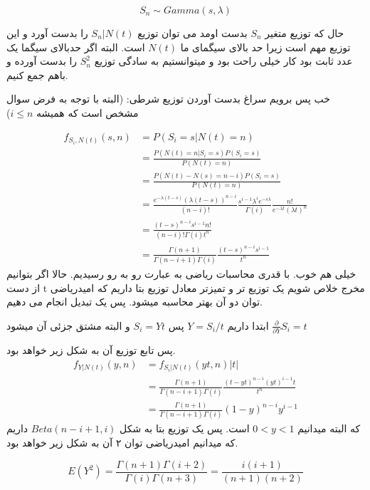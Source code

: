 \documentclass{article}[12pt]
\begin{document}
\begin{equation}
S_n \sim Gamma(s,\lambda)
\end{equation}

حال که توزیع متغیر 
$S_n$
بدست اومد می توان توزیع 
$S_n|N(t)$
را بدست آورد و این توزیع مهم است زیرا حد بالای سیگمای ما 
$N(t)$
است. البته اگر حدبالای سیگما یک عدد ثابت بود کار خیلی راحت بود و میتوانستیم به سادگی توزیع
$S_n^2$
را بدست آورده و باهم جمع کنیم. 

خب پس برویم سراغ بدست آوردن توزیع شرطی:
(البته با توجه به فرض سوال مشخص است که همیشه
$i\leq n$)

\begin{equation}
\begin{split}
f_{S_i,N(t)}(s,n) &= 
P(S_i = s | N(t)=n) \\&= 
\frac{P(N(t)=n|S_i = s)P(S_i=s)}{P(N(t)=n)}\\
&= 
\frac{P(N(t)-N(s) = n-i)P(S_i=s)}{P(N(t)=n)}
\\
&= 
\frac{e^{-\lambda (t-s)}(\lambda(t-s))^{n-i}}{(n-i)!}
\frac{s^{i-1} \lambda^i e^{-s\lambda}}{\Gamma(i)}
\frac{n!}{e^{-\lambda t} (\lambda t)^n}
\\
&= 
\frac{(t-s)^{n-i} s^{i-1} n!}{(n-i)! \Gamma(i) t^n}
\\
&= 
\frac{\Gamma(n+1)}{\Gamma(n-i+1)\Gamma(i)} 
\frac{(t-s)^{n-i} s^{i-1}}{t^n}
\end{split}
\end{equation}
خیلی هم خوب. با قدری محاسبات ریاضی به عبارت رو به رو رسیدیم. حالا اگر بتوانیم از دست t مخرج خلاص شویم یک توزیع تر و تمیزتر معادل توزیع بتا داریم که امیدریاضی توان دو آن بهتر محاسبه میشود. پس یک تبدیل انجام می دهیم. 

ابتدا داریم
$Y = S_i/t$
پس 
$S_i = Yt$
و البته مشتق جزئی آن میشود 
$\frac{\partial}{\partial Y} S_i = t$

پس تابع توزیع آن به شکل زیر خواهد بود.
\begin{equation}
\begin{split}
f_{Y|N(t)}(y,n) &= f_{S_i|N(t)}(yt,n)|t| \\
&= \frac{\Gamma(n+1)}{\Gamma(n-i+1)\Gamma(i) } 
\frac{(t-yt)^{n-i}  (yt)^{i-1} t}{t^n} 
\\
&= 
\frac{\Gamma(n+1)}{\Gamma(n-i+1)\Gamma(i) } 
(1-y)^{n-i} y^{i-1}
\end{split}
\end{equation}
که البته میدانیم 
$0<y<1$
 است. 
پس یک توزیع بتا به شکل 
$Beta(n-i+1,i)$
 داریم که میدانیم امیدریاضی توان ۲ آن به شکل زیر خواهد بود.
 
 \begin{equation}
 E \left( Y^2 \right) = 
 \frac{\Gamma(n+1)\Gamma(i+2)}
 {\Gamma(i)\Gamma(n+3)} = \frac{i(i+1)}{(n+1)(n+2)}
 \end{equation}
\end{document}
